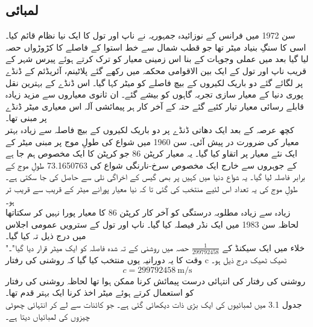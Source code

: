 \documentclass[leqno, b5paper]{khalid-urdu-book}
\begin{document}
	\subsection{لمبائی}
	سن 1972 میں فرانس کے نوزائیدہ جمہوریہ نے ناپ اور تول کا ایک نیا نظام قائم کیا۔ اسی کا سنگِ بنیاد میٹر تھا جو قطب شمال سے خط استوا کے فاصلے کا کڑوڑواں حصہ لیا گیا بعد میں عملی وجوہات کے بنا اس زمینی معیار کو ترک کرتے ہوئے پیرس شہر کے قریب ناپ اور تول کے ایک بین الاقوامی محکمہ میں رکھے گئے پلاٹینم، آئریڈئم کے ڈنڈے پر لگائے گئے دو باریک لکیروں کے بیچ فاصلے کو میٹر کہا گیا۔ اس ڈنڈے کے بہترین نقل پوری دنیا کے معیار سازی تجربہ گاہوں کو بیشے گئے۔ ان ثانوی معیاروں سے مزید زیادہ قابلے رسائی معیار تیار کئیے گئے حتہ کے آخر کار ہر پیمائشی آلہ اس معیاری میٹر ڈنڈے پر مبنی تھا۔\\کچھ عرصہ کے بعد ایک دھاتی ڈنڈے پر دو باریک لکیروں کے بیچ فاصلہ سے زیادہ بہتر معیار کی ضرورت در پیش آئی۔ سن 1960 میں شواع کی طولِ موج پر مبنی میٹر کے ایک نئے معیار پر اتقاو کیا گیا۔ یہ معیار کرپٹن 86 جو کرپٹن کا ایک مخصوص ہم جا ہے کے جوہروں سے خارج ایک مخصوص سرخ-نارنگی شواع کی 73.1650763 طولِ موج کے برابر فاصلہ لیا گیا۔ یہ شواع دنیا میں کہیں پر بھی گیس کے اخراگی نلی سے حاصل کی جا سکتی ہے۔ طولِ موج کی یہ تعداد اس لئیے منتخب کی گئی تا کہ نیا معیار پورانے میٹر کے قریب سے قریب تر ہو۔\\زیادہ سے زیادہ مطلوبہ درستگی کو آخر کار کرپٹن 86 کا معیار پورا نہیں کر سکتاتھا لحاظہ سن 1983 میں ایک نڈر فیصلہ کیا گیا۔ ناپ اور تول کے سترویں عمومی اجلاس میں درج ذیل تہ کیا گیا۔\\"خلاء میں ایک سیکنڈ کے \(\frac{\num{1}}{\num{299792458}}\) حصہ میں روشنی کے تہ شدہ فاصلہ کو ایک میٹر قرار دیا گیا"۔\\وقت کا یہ دورانیہ یوں منتخب کیا گیا کہ روشنی کی رفتار c ٹھیک ٹھیک درج ذیل ہو۔
	\[c = \SI{299792458}{\meter\per\second}\]
	روشنی کی رفتار کی انتہائی درست پیمائش کرنا ممکن ہوا تھا لحاظہ روشنی کی رفتار کو استعمال کرتے ہوئے میٹر اخذ کرنا ایک بہتر قدم تھا۔\\جدول 3.1 میں لمبائیوں کی ایک بڑی ذات دیکھائی گئی ہے۔ جو کائنات سے لے کر انتہائی چھوٹی چیزوں کی لمبائیاں دیتا ہے۔
\end{document}

